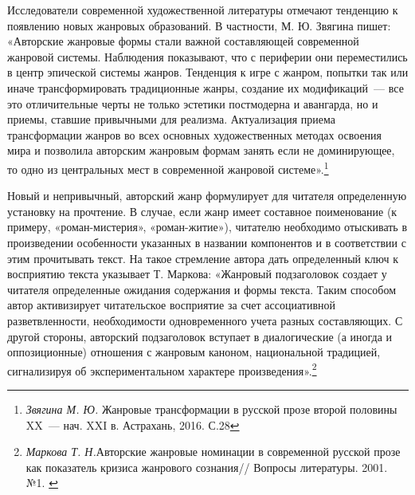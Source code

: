 \documentclass{kursa4}
\begin{document}
    Исследователи современной художественной литературы отмечают тенденцию к появлению новых жанровых образований. В частности, М. Ю. Звягина пишет: «Авторские жанровые формы стали важной составляющей современной жанровой системы. Наблюдения показывают, что с периферии они переместились в центр эпической системы жанров. Тенденция к игре с жанром, попытки так или иначе трансформировать традиционные жанры, создание их модификаций~--- все это отличительные черты не только эстетики постмодерна и авангарда, но и приемы, ставшие привычными для реализма. Актуализация приема трансформации жанров во всех основных художественных методах освоения мира и позволила авторским жанровым формам занять если не доминирующее, то одно из центральных мест в современной жанровой системе».\footnote{\textit{Звягина М. Ю. }{Жанровые трансформации в русской прозе второй половины XX~--- нач. XXI в. Астрахань, 2016. С.28}}

    Новый и непривычный, авторский жанр формулирует для читателя определенную установку на прочтение. В случае, если жанр имеет составное поименование (к примеру, «роман-мистерия», «роман-житие»), читателю необходимо отыскивать в произведении особенности указанных в названии компонентов и в соответствии с этим прочитывать текст. На такое стремление автора дать определенный ключ к восприятию текста указывает Т. Маркова:\newline
    «Жанровый подзаголовок создает у читателя определенные ожидания содержания и формы текста. Таким способом автор активизирует читательское восприятие за счет ассоциативной разветвленности, необходимости одновременного учета разных составляющих. С другой стороны, авторский подзаголовок вступает в диалогические (а иногда и оппозиционные) отношения с жанровым каноном, национальной традицией, сигнализируя об экспериментальном характере произведения».\footnote{{ }\textit{{Маркова Т. Н.}}{Авторские жанровые номинации в современной русской прозе как показатель кризиса жанрового сознания// Вопросы литературы. 2001. №1. }}
\end{document}
